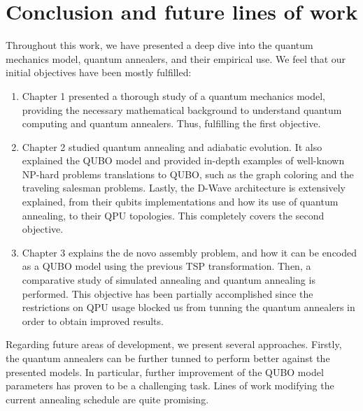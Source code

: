 \chapter*{Conclusion and future lines of work}

Throughout this work, we have presented a deep dive into the quantum mechanics model, quantum annealers, and their empirical use. We feel that our initial objectives have been mostly fulfilled:

\begin{enumerate}
	\item Chapter 1 presented a thorough study of a quantum mechanics model, providing the necessary mathematical background to understand quantum computing and quantum annealers. Thus, fulfilling the first objective.
	
	\item Chapter 2 studied quantum annealing and adiabatic evolution. It also explained the QUBO model and provided in-depth examples of well-known NP-hard problems translations to QUBO, such as the graph coloring and the traveling salesman problems. Lastly, the D-Wave architecture is extensively explained, from their qubits implementations and how its use of quantum annealing, to their QPU topologies. This completely covers the second objective.
	
	\item Chapter 3 explains the de novo assembly problem, and how it can be encoded as a QUBO model using the previous TSP transformation. Then, a comparative study of simulated annealing and quantum annealing is performed. This objective has been partially accomplished since the restrictions on QPU usage blocked us from tunning the quantum annealers in order to obtain improved results.
\end{enumerate}

Regarding future areas of development, we present several approaches. Firstly, the quantum annealers can be further tunned to perform better against the presented models. In particular, further improvement of the QUBO model parameters has proven to be a challenging task. Lines of work modifying the current annealing schedule are quite promising.

